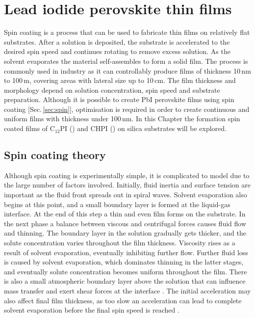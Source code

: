 
\chapter{Lead iodide perovskite thin films}

\graphicspath{{Chapter4/Figures/}}

Spin coating is a process that can be used to fabricate thin films on relatively flat substrates. After a solution is deposited, the substrate is accelerated to the desired spin speed and continues rotating to remove excess solution. As the solvent evaporates the material self-assembles to form a solid film. The process is commonly used in industry as it can controllably produce films of thickness 10\,nm to 100\,\textmu m, covering areas with lateral size up to 10\,cm. The film thickness and morphology depend on solution concentration, spin speed and substrate preparation. Although it is possible to create PbI perovskite films using spin coating [Sec.\,\ref{sec:spin}], optimisation is required in order to create continuous and uniform films with thickness under 100\,nm. In this Chapter the formation spin coated films of C$_{12}$PI () and CHPI () on silica substrates will be explored.

\section{Spin coating theory}
Although spin coating is experimentally simple, it is complicated to model due to the large number of factors involved. Initially, fluid inertia and surface tension are important as the fluid front spreads out in spiral waves. Solvent evaporation also begins at this point, and a small boundary layer is formed at the liquid-gas interface. At the end of this step a thin and even film forms on the substrate. In the next phase a balance between viscous and centrifugal forces causes fluid flow and thinning. The boundary layer in the solution gradually gets thicker, and the solute concentration varies throughout the film thickness. Viscosity rises as a result of solvent evaporation, eventually inhibiting further flow. Further fluid loss is caused by solvent evaporation, which dominates thinning in the latter stages, and eventually solute concentration becomes uniform throughout the film. There is also a small atmospheric boundary layer above the solution that can influence mass transfer and exert shear forces at the interface \cite{Meyerhofer1978, VanHardeveld1995, Lawrence1988}. The initial acceleration may also affect final film thickness, as too slow an acceleration can lead to complete solvent evaporation before the final spin speed is reached \cite{Birnie2005}.

